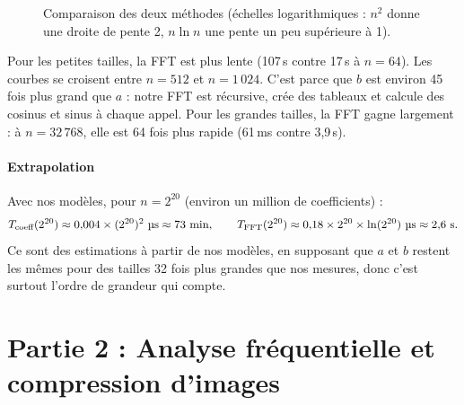 \documentclass[11pt,a4paper]{article}
\newcommand{\us}{\,\textmu s\xspace}
\begin{document}
\begin{figure}[H]
\centering
{}
\caption{Comparaison des deux méthodes (échelles logarithmiques : $n^2$ donne une
droite de pente 2, $n \ln n$ une pente un peu supérieure à 1).}
\label{fig:comparaison}
\end{figure}

Pour les petites tailles, la FFT est plus lente (107\us contre 17\us à $n = 64$). Les
courbes se croisent entre $n = 512$ et $n = 1\,024$. C'est parce que $b$ est environ
45 fois plus grand que $a$ : notre FFT est récursive, crée des tableaux et calcule
des cosinus et sinus à chaque appel. Pour les grandes tailles, la FFT gagne
largement : à $n = 32\,768$, elle est 64 fois plus rapide (61\,ms contre 3,9\,s).

\subsection{Extrapolation}

Avec nos modèles, pour $n = 2^{20}$ (environ un million de coefficients) :
\[
  T_{\text{coeff}}(2^{20}) \approx 0{,}004 \times (2^{20})^2\ \text{\textmu s} \approx 73\ \text{min},
  \qquad
  T_{\text{FFT}}(2^{20}) \approx 0{,}18 \times 2^{20} \times \ln(2^{20})\ \text{\textmu s} \approx 2{,}6\ \text{s}.
\]
Ce sont des estimations à partir de nos modèles, en supposant que $a$ et $b$ restent
les mêmes pour des tailles 32 fois plus grandes que nos mesures, donc c'est surtout
l'ordre de grandeur qui compte.

\part*{Partie 2 : Analyse fréquentielle et compression d'images}
\end{document}
